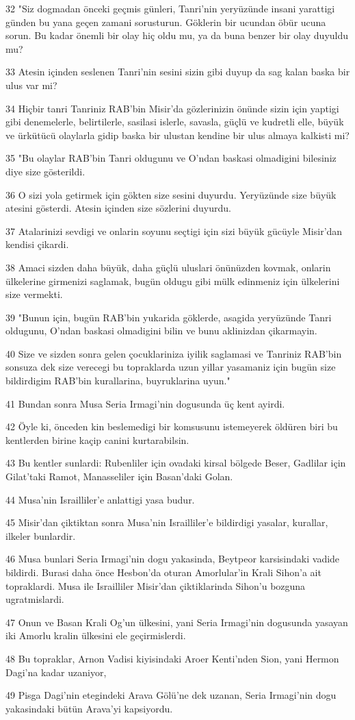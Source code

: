 \par 32 "Siz dogmadan önceki geçmis günleri, Tanri'nin yeryüzünde insani yarattigi günden bu yana geçen zamani sorusturun. Göklerin bir ucundan öbür ucuna sorun. Bu kadar önemli bir olay hiç oldu mu, ya da buna benzer bir olay duyuldu mu?
\par 33 Atesin içinden seslenen Tanri'nin sesini sizin gibi duyup da sag kalan baska bir ulus var mi?
\par 34 Hiçbir tanri Tanriniz RAB'bin Misir'da gözlerinizin önünde sizin için yaptigi gibi denemelerle, belirtilerle, sasilasi islerle, savasla, güçlü ve kudretli elle, büyük ve ürkütücü olaylarla gidip baska bir ulustan kendine bir ulus almaya kalkisti mi?
\par 35 "Bu olaylar RAB'bin Tanri oldugunu ve O'ndan baskasi olmadigini bilesiniz diye size gösterildi.
\par 36 O sizi yola getirmek için gökten size sesini duyurdu. Yeryüzünde size büyük atesini gösterdi. Atesin içinden size sözlerini duyurdu.
\par 37 Atalarinizi sevdigi ve onlarin soyunu seçtigi için sizi büyük gücüyle Misir'dan kendisi çikardi.
\par 38 Amaci sizden daha büyük, daha güçlü uluslari önünüzden kovmak, onlarin ülkelerine girmenizi saglamak, bugün oldugu gibi mülk edinmeniz için ülkelerini size vermekti.
\par 39 "Bunun için, bugün RAB'bin yukarida göklerde, asagida yeryüzünde Tanri oldugunu, O'ndan baskasi olmadigini bilin ve bunu aklinizdan çikarmayin.
\par 40 Size ve sizden sonra gelen çocuklariniza iyilik saglamasi ve Tanriniz RAB'bin sonsuza dek size verecegi bu topraklarda uzun yillar yasamaniz için bugün size bildirdigim RAB'bin kurallarina, buyruklarina uyun."
\par 41 Bundan sonra Musa Seria Irmagi'nin dogusunda üç kent ayirdi.
\par 42 Öyle ki, önceden kin beslemedigi bir komsusunu istemeyerek öldüren biri bu kentlerden birine kaçip canini kurtarabilsin.
\par 43 Bu kentler sunlardi: Rubenliler için ovadaki kirsal bölgede Beser, Gadlilar için Gilat'taki Ramot, Manasseliler için Basan'daki Golan.
\par 44 Musa'nin Israilliler'e anlattigi yasa budur.
\par 45 Misir'dan çiktiktan sonra Musa'nin Israilliler'e bildirdigi yasalar, kurallar, ilkeler bunlardir.
\par 46 Musa bunlari Seria Irmagi'nin dogu yakasinda, Beytpeor karsisindaki vadide bildirdi. Burasi daha önce Hesbon'da oturan Amorlular'in Krali Sihon'a ait topraklardi. Musa ile Israilliler Misir'dan çiktiklarinda Sihon'u bozguna ugratmislardi.
\par 47 Onun ve Basan Krali Og'un ülkesini, yani Seria Irmagi'nin dogusunda yasayan iki Amorlu kralin ülkesini ele geçirmislerdi.
\par 48 Bu topraklar, Arnon Vadisi kiyisindaki Aroer Kenti'nden Sion, yani Hermon Dagi'na kadar uzaniyor,
\par 49 Pisga Dagi'nin etegindeki Arava Gölü'ne dek uzanan, Seria Irmagi'nin dogu yakasindaki bütün Arava'yi kapsiyordu.

